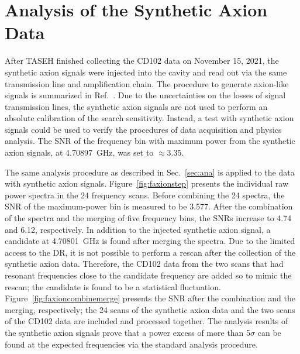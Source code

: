 \section{Analysis of the Synthetic Axion Data}\label{sec:faxion}
After TASEH finished collecting the CD102 data on November 15, 2021, 
the synthetic axion signals were injected into the cavity and read out via the 
same transmission line and amplification chain. The procedure 
to generate axion-like signals is summarized in 
Ref.~\cite{TASEHInstrumentation}. 
Due to the uncertainties on the losses of signal transmission
 lines, the synthetic axion signals are not used to perform an absolute 
calibration of the search sensitivity. Instead, 
a test with synthetic axion signals could be used to verify the procedures of 
data acquisition and physics analysis. The 
SNR of the frequency bin with maximum power from the 
synthetic axion signals, at 4.70897~GHz, was set to $\approx 3.35$.%

The same analysis procedure as described in Sec.~\ref{sec:ana} is applied 
to the data with synthetic axion signals. 
Figure~\ref{fig:faxionstep} presents the individual raw power spectra in 
the 24 frequency scans. Before combining 
the 24 spectra, the SNR of the maximum-power bin is measured to be 
3.577. %
After the combination of the spectra and the merging of five frequency 
bins, the SNRs increase to 4.74 and 6.12, respectively. In addition to the 
injected synthetic axion signal, a candidate at 4.70801~GHz is found after 
merging the spectra. Due to the limited access to the DR, 
it is not possible to perform a rescan after the collection of the 
synthetic axion data. Therefore,  
the CD102 data from the two scans that had resonant frequencies close to 
the candidate frequency are added so to mimic the rescan; the candidate is 
found to be a statistical fluctuation.  
Figure~\ref{fig:faxioncombinemerge} presents 
the SNR %
after the combination and the merging, respectively;    
the 24 scans of the 
synthetic axion data and the two 
scans of the CD102 data are included and processed together. 
The analysis results of the synthetic axion signals prove that a power 
excess of more than 5$\sigma$ can be found at the expected frequencies via 
the standard analysis procedure.  

